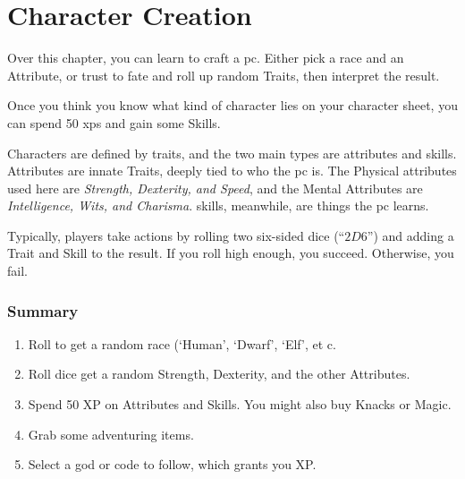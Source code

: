 \chapter{Character Creation}\label{character_rolls}

\begin{multicols}{2}

\noindent
Over this chapter, you can learn to craft a \gls{pc}.
Either pick a race and an Attribute, or trust to fate and roll up random Traits, then interpret the result.

Once you think you know what kind of character lies on your character sheet, you can spend 50 \glspl{xp} and gain some Skills.

Characters are defined by \glspl{trait}, and the two main types are \glspl{attribute} and \glspl{skill}.
Attributes are innate Traits, deeply tied to who the \gls{pc} is.
The Physical \glspl{attribute} used here are \textit{Strength, Dexterity, and Speed}, and the Mental Attributes are \textit{Intelligence, Wits, and Charisma}.
\glspl{skill}, meanwhile, are things the \gls{pc} learns.

Typically, players take actions by rolling two six-sided dice (``$2D6$'') and adding a Trait and Skill to the result.  If you roll high enough, you succeed.
Otherwise, you fail.

\subsection{Summary}

\begin{enumerate}

\item{Roll to get a random race (`Human', `Dwarf', `Elf', et c.}
\item{Roll dice get a random Strength, Dexterity, and the other Attributes.}
\item{Spend 50 XP on Attributes and Skills. You might also buy Knacks or Magic.}
\item{Grab some adventuring items.}
\item{Select a god or code to follow, which grants you XP.}

\end{enumerate}

\end{multicols}

